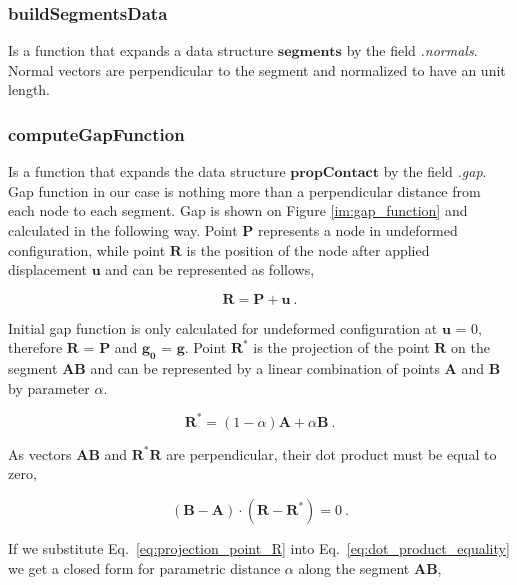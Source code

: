 \documentclass[10pt,a4paper]{article}
\begin{document}
\subsubsection{buildSegmentsData}

Is a function that expands a data structure $\textbf{segments}$ by the field \textit{.normals}. Normal vectors are perpendicular to the segment and normalized to have an unit length. 

\subsubsection{computeGapFunction}

Is a function that expands the data structure $\textbf{propContact}$ by the field \textit{.gap}. Gap function in our case is nothing more than a perpendicular distance from each node to each segment. Gap is shown on Figure \ref{im:gap_function} and calculated in the following way. Point $\mathbf{P}$ represents a node in undeformed configuration, while point $\mathbf{R}$ is the position of the node after applied displacement $\mathbf{u}$ and can be represented as follows,

\begin{equation}
	\mathbf{R} = \mathbf{P} + \mathbf{u} \:.
	\label{eq:point_after_displacement}
\end{equation}

Initial gap function is only calculated for undeformed configuration at $\mathbf{u}$ = 0, therefore $\mathbf{R}$ = $\mathbf{P}$ and $\mathbf{g_0}$ = $\mathbf{g}$. Point $\mathbf{R}^*$ is the projection of the point $\mathbf{R}$ on the segment $\mathbf{AB}$ and can be represented by a linear combination of points $\mathbf{A}$ and $\mathbf{B}$ by parameter $\alpha$.

\begin{equation}
	\mathbf{R}^\ast = (1-\alpha)\mathbf{A} + \alpha\mathbf{B} \:.
	\label{eq:projection_point_R}
\end{equation}

As vectors $\mathbf{AB}$ and $\mathbf{R}^*\mathbf{R}$ are perpendicular, their dot product must be equal to zero,

\begin{equation}
	(\mathbf{B}-\mathbf{A})\cdot(\mathbf{R}-\mathbf{R}^*) = 0 \:.
	\label{eq:dot_product_equality}
\end{equation}

If we substitute Eq.~\eqref{eq:projection_point_R} into Eq.~\eqref{eq:dot_product_equality} we get a closed form for parametric distance $\alpha$ along the segment $\mathbf{AB}$,
\end{document}
